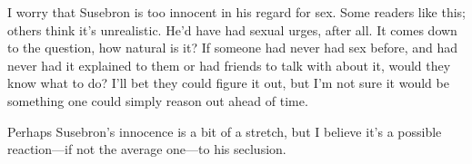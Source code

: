 I worry that Susebron is too innocent in his regard for sex. Some readers like this; others think it’s unrealistic. He’d have had sexual urges, after all. It comes down to the question, how natural is it? If someone had never had sex before, and had never had it explained to them or had friends to talk with about it, would they know what to do? I’ll bet they could figure it out, but I’m not sure it would be something one could simply reason out ahead of time.

Perhaps Susebron’s innocence is a bit of a stretch, but I believe it’s a possible reaction—if not the average one—to his seclusion.



